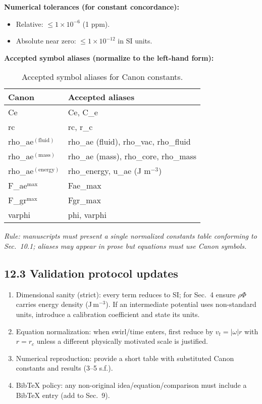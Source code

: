 \documentclass[11pt, a4paper]{article}
\begin{document}
\textbf{Numerical tolerances (for constant concordance):}
\begin{itemize}
    \item Relative: $\leq 1\times 10^{-6}$ (1 ppm).
    \item Absolute near zero: $\leq 1\times 10^{-12}$ in SI units.
\end{itemize}

\textbf{Accepted symbol aliases (normalize to the left-hand form):}

\begin{table}[h!]
\centering
\begin{tabular}{|l|l|}
\hline
\textbf{Canon} & \textbf{Accepted aliases} \\
\hline
Ce & Ce, C\_e \\
rc & rc, r\_c \\
rho\_ae$^{(\text{fluid})}$ & rho\_ae (fluid), rho\_vac, rho\_fluid \\
rho\_ae$^{(\text{mass})}$ & rho\_ae (mass), rho\_core, rho\_mass \\
rho\_ae$^{(\text{energy})}$ & rho\_energy, u\_ae (J m$^{-3}$) \\
F\_ae$^{\max}$ & Fae\_max \\
F\_gr$^{\max}$ & Fgr\_max \\
varphi & phi, varphi \\
\hline
\end{tabular}
\caption{Accepted symbol aliases for Canon constants.}
\end{table}

\textit{Rule: manuscripts must present a single normalized constants table conforming to Sec.~10.1; aliases may appear in prose but equations must use Canon symbols.}

\subsection*{12.3 Validation protocol updates}

\begin{enumerate}
    \item Dimensional sanity (strict): every term reduces to SI; for Sec.~4 ensure $\rho \Phi$ carries energy density (J\,m$^{-3}$). If an intermediate potential uses non-standard units, introduce a calibration coefficient and state its units.
    \item Equation normalization: when swirl/time enters, first reduce by $v_t = |\omega| r$ with $r = r_c$ unless a different physically motivated scale is justified.
    \item Numerical reproduction: provide a short table with substituted Canon constants and results (3--5 s.f.).
    \item BibTeX policy: any non-original idea/equation/comparison must include a BibTeX entry (add to Sec.~9).
\end{enumerate}
\end{document}
